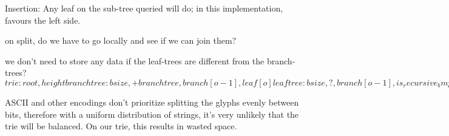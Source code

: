 \documentclass[12pt]{article}
\begin{document}
Insertion: Any leaf on the sub-tree queried will do; in this implementation, favours the left side.

on split, do we have to go locally and see if we can join them?

we don't need to store any data if the leaf-trees are different from the branch-trees?
$
trie: root, height
branch tree: bsize, +branchtree, branch[o-1], leaf[o]
leaf tree: bsize, ?, branch[o-1], is_recursive_bmp[o/8], leaf[o]
or
leaf tree: bsize, ?, branch[o-1], leaf[o] { skip, union{ data, trie } }
or
leaf tree: bsize, ?, branch[o-1], leaf[o] { 32:skip, 32:height, 64:root / 64:data }
$

ASCII and other encodings don't prioritize splitting the glyphs evenly between bits, therefore with a uniform distribution of strings, it's very unlikely that the trie will be balanced. On our trie, this results in wasted space.


\end{document}
